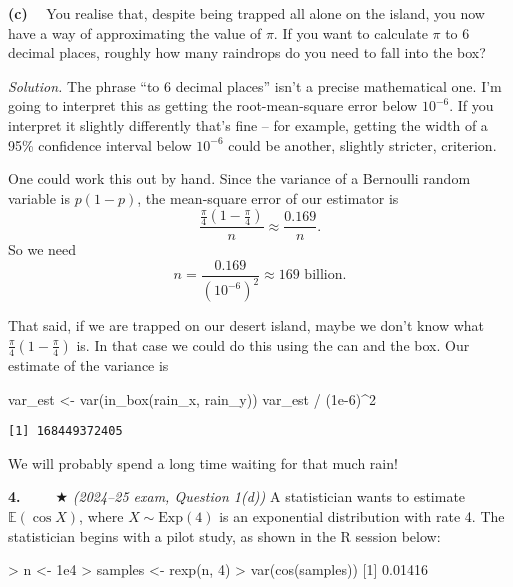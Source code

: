 \documentclass[
  letterpaper,
  DIV=11,
  numbers=noendperiod]{scrreprt}
\newenvironment{Shaded}{\begin{snugshade}}{\end{snugshade}}
\newcommand{\DecValTok}[1]{\textcolor[rgb]{0.68,0.00,0.00}{#1}}
\newcommand{\FloatTok}[1]{\textcolor[rgb]{0.68,0.00,0.00}{#1}}
\newcommand{\FunctionTok}[1]{\textcolor[rgb]{0.28,0.35,0.67}{#1}}
\newcommand{\NormalTok}[1]{\textcolor[rgb]{0.00,0.23,0.31}{#1}}
\newcommand{\OtherTok}[1]{\textcolor[rgb]{0.00,0.23,0.31}{#1}}
\newcommand{\SpecialCharTok}[1]{\textcolor[rgb]{0.37,0.37,0.37}{#1}}
\theoremstyle{plain}
\theoremstyle{definition}
\theoremstyle{definition}
\theoremstyle{remark}
\begin{document}
\textbf{(c)} ~~You realise that, despite being trapped all alone on the
island, you now have a way of approximating the value of \(\pi\). If you
want to calculate \(\pi\) to 6 decimal places, roughly how many
raindrops do you need to fall into the box?

\emph{Solution.} The phrase ``to 6 decimal places'' isn't a precise
mathematical one. I'm going to interpret this as getting the
root-mean-square error below \(10^{-6}\). If you interpret it slightly
differently that's fine -- for example, getting the width of a 95\%
confidence interval below \(10^{-6}\) could be another, slightly
stricter, criterion.

One could work this out by hand. Since the variance of a Bernoulli
random variable is \(p(1-p)\), the mean-square error of our estimator is
\[ \frac{\frac{\pi}{4}(1 - \frac{\pi}{4})}{n} \approx \frac{0.169}{n} . \]
So we need
\[n = \frac{0.169}{(10^{-6})^2} \approx 169 \text{ billion} . \]

That said, if we are trapped on our desert island, maybe we don't know
what \(\frac{\pi}{4}(1 - \frac{\pi}{4})\) is. In that case we could do
this using the can and the box. Our estimate of the variance is

\begin{Shaded}
\begin{Highlighting}[]
\NormalTok{var\_est }\OtherTok{\textless{}{-}} \FunctionTok{var}\NormalTok{(}\FunctionTok{in\_box}\NormalTok{(rain\_x, rain\_y))}
\NormalTok{var\_est }\SpecialCharTok{/}\NormalTok{ (}\FloatTok{1e{-}6}\NormalTok{)}\SpecialCharTok{\^{}}\DecValTok{2}
\end{Highlighting}
\end{Shaded}

\begin{verbatim}
[1] 168449372405
\end{verbatim}

We will probably spend a long time waiting for that much rain!

\textbf{4.}~~~~~★ \emph{(2024--25 exam, Question 1(d))} A statistician
wants to estimate \(\mathbb E(\cos X)\), where
\(X \sim \operatorname{Exp(4)}\) is an exponential distribution with
rate 4. The statistician begins with a pilot study, as shown in the R
session below:

\begin{Shaded}
\begin{Highlighting}[]
   \SpecialCharTok{\textgreater{}}\NormalTok{ n }\OtherTok{\textless{}{-}} \FloatTok{1e4}
\SpecialCharTok{\textgreater{}}\NormalTok{ samples }\OtherTok{\textless{}{-}} \FunctionTok{rexp}\NormalTok{(n, }\DecValTok{4}\NormalTok{)}
\SpecialCharTok{\textgreater{}} \FunctionTok{var}\NormalTok{(}\FunctionTok{cos}\NormalTok{(samples))}
\NormalTok{[}\DecValTok{1}\NormalTok{] }\FloatTok{0.01416}
\end{Highlighting}
\end{Shaded}
\end{document}

